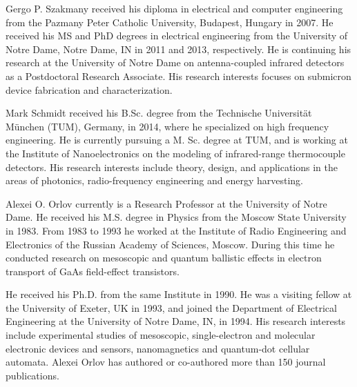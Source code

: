 \documentclass[journal]{IEEEtran}
\begin{document}
\begin{IEEEbiography}
{Gergo P. Szakmany} received his diploma in electrical and computer engineering from the Pazmany Peter Catholic University, Budapest, Hungary in 2007. He received his MS and PhD degrees in electrical engineering from the University of Notre Dame, Notre Dame, IN in 2011 and 2013, respectively. He is continuing his research at the University of Notre Dame on antenna-coupled infrared detectors as a Postdoctoral Research Associate. His research interests focuses on submicron device fabrication and characterization.
\end{IEEEbiography}
%
%
\begin{IEEEbiography} 
{Mark Schmidt} received his B.Sc. degree from the Technische Universit\"at M\"unchen (TUM), Germany, in 2014, where he specialized on high frequency engineering. He is currently pursuing a M. Sc. degree at TUM, and is working at the Institute of Nanoelectronics on the modeling of infrared-range thermocouple detectors. His research interests include theory, design, and applications in the areas of photonics, radio-frequency engineering and energy harvesting.
\end{IEEEbiography}
%
%
\begin{IEEEbiography}
   {Alexei O. Orlov} currently is a Research Professor at the University of Notre Dame. He received his M.S. degree in Physics from the Moscow State University in 1983. From 1983 to 1993 he worked at the Institute of Radio Engineering and Electronics of the Russian Academy of Sciences, Moscow. During this time he conducted research on mesoscopic and quantum ballistic effects in electron transport of GaAs field-effect transistors.
   
He received his Ph.D. from the same Institute in 1990. He was a visiting fellow at the University of Exeter, UK in 1993, and joined the Department of Electrical Engineering at the University of Notre Dame, IN, in 1994. His research interests include experimental studies of mesoscopic, single-electron and molecular electronic devices and sensors, nanomagnetics and quantum-dot cellular automata. Alexei Orlov has authored or co-authored more than 150 journal publications.
\end{IEEEbiography}
\end{document}
